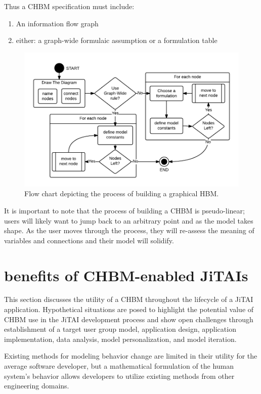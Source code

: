 \documentclass[runningheads,a4paper]{llncs}
\begin{document}
Thus a CHBM specification must include:
\begin{enumerate}
  \item An information flow graph
  \item either: a graph-wide formulaic assumption or a formulation table 
\end{enumerate}

\begin{figure}[!t]
  \centering
  \includegraphics[width=0.9\columnwidth]{img/HBM-build-process}
  \caption{Flow chart depicting the process of building a graphical HBM.}
  \label{HBM-build-process}
\end{figure}

It is important to note that the process of building a CHBM is pseudo-linear; users will likely want to jump back to an arbitrary point and as the model takes shape. 
As the user moves through the process, they will re-assess the meaning of variables and connections and their model will solidify. 

\section{benefits of CHBM-enabled JiTAIs}
This section discusses the utility of a CHBM throughout the lifecycle of a JiTAI application.
Hypothetical situations are posed to highlight the potential value of CHBM use in the JiTAI development process and show open challenges through establishment of a target user group model, application design, application implementation, data analysis, model personalization, and model iteration.

Existing methods for modeling behavior change are limited in their utility for the average software developer, but a mathematical formulation of the human system’s behavior allows developers to utilize existing methods from other engineering domains.
\end{document}
